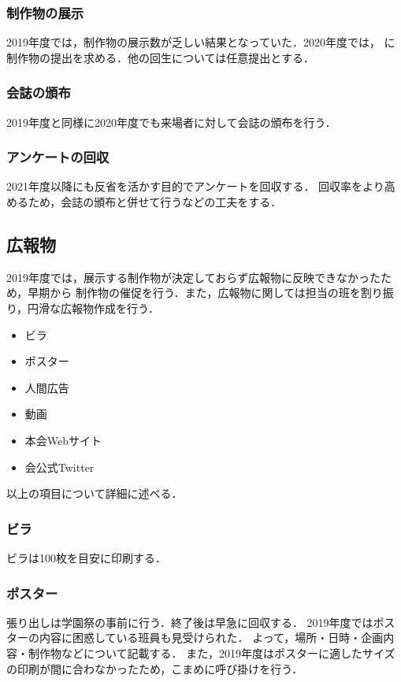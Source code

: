 \subsubsection*{制作物の展示}
2019年度では，制作物の展示数が乏しい結果となっていた．2020年度では，\secondGrade{}
に制作物の提出を求める．他の回生については任意提出とする．

\subsubsection*{会誌の頒布}
2019年度と同様に2020年度でも来場者に対して会誌の頒布を行う．

\subsubsection*{アンケートの回収}
2021年度以降にも反省を活かす目的でアンケートを回収する．
回収率をより高めるため，会誌の頒布と併せて行うなどの工夫をする．

\subsection*{広報物}
2019年度では，展示する制作物が決定しておらず広報物に反映できなかったため，早期から
制作物の催促を行う．また，広報物に関しては担当の班を割り振り，円滑な広報物作成を行う．
\begin{itemize}
    \item ビラ
    \item ポスター
    \item 人間広告
    \item 動画
    \item 本会Webサイト
    \item 会公式Twitter
\end{itemize}
以上の項目について詳細に述べる．
\subsubsection*{ビラ}
ビラは100枚を目安に印刷する．

\subsubsection*{ポスター}
張り出しは学園祭の事前に行う．終了後は早急に回収する．
2019年度ではポスターの内容に困惑している班員も見受けられた．
よって，場所・日時・企画内容・制作物などについて記載する．
また，2019年度はポスターに適したサイズの印刷が間に合わなかったため，こまめに呼び掛けを行う．


